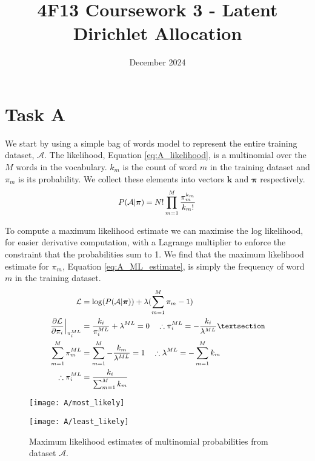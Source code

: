 \documentclass[11pt]{article}
\title{\vspace{-2cm}4F13 Coursework 3 - Latent Dirichlet Allocation}
\author{}
\date{December 2024}
\begin{document}


\setcounter{page}{1}

\maketitle

\section{Task A}

We start by using a simple bag of words model to represent the entire training dataset, $\mathcal{A}$. The likelihood, Equation \ref{eq:A_likelihood}, is a multinomial over the $M$ words in the vocabulary. $k_m$ is the count of word $m$ in the training dataset and $\pi_m$ is its probability. We collect these elements into vectors $\boldsymbol{k}$ and $\boldsymbol{\pi}$ respectively.
\begin{equation}
    \small
    P(\mathcal{A} | \boldsymbol{\pi}) = N! \prod_{m=1}^{M} \frac{\pi_m^{k_m}}{k_m!}
    \label{eq:A_likelihood}
\end{equation}

To compute a maximum likelihood estimate we can maximise the log likelihood, for easier derivative computation, with a Lagrange multiplier to enforce the constraint that the probabilities sum to 1. We find that the maximum likelihood estimate for $\pi_m$, Equation \ref{eq:A_ML_estimate}, is simply the frequency of word $m$ in the training dataset.
\begin{equation}
    \small
    \begin{aligned}
        \mathcal{L} &= \log(P(\mathcal{A} | \boldsymbol{\pi})) + \lambda (\sum_{m=1}^{M} \pi_m - 1) \\
        \left . \frac{\partial \mathcal{L}}{\partial \pi_i} \right \rvert_{\pi_i^{ML}} &= \frac{k_i}{\pi_i^{ML}} + \lambda^{ML} = 0 \quad \therefore \pi_i^{ML} = - \frac{k_i}{\lambda^{ML}}§ \\
        \sum_{m=1}^{M} \pi_m^{ML} &= \sum_{m=1}^{M} -\frac{k_m}{\lambda^{ML}} = 1 \quad \therefore \lambda^{ML} = -\sum_{m=1}^{M} k_m \\
        \therefore \pi_i^{ML} &= \frac{k_i}{\sum_{m=1}^{M} k_m}
    \end{aligned}
    \label{eq:A_ML_estimate}
\end{equation}
\begin{figure}
    \centering
    \begin{minipage}{0.49\textwidth}
        \centering
        \texttt{[image: A/most\_likely]}
        \label{fig:A_most_likely_words}
    \end{minipage}
    \begin{minipage}{0.49\textwidth}
        \centering
        \texttt{[image: A/least\_likely]}
        \label{fig:A_least_likely_words}
    \end{minipage}
    \caption{Maximum likelihood estimates of multinomial probabilities from dataset $\mathcal{A}$.}
    \label{fig:A_ML_estimates}
\end{figure}
\end{document}
